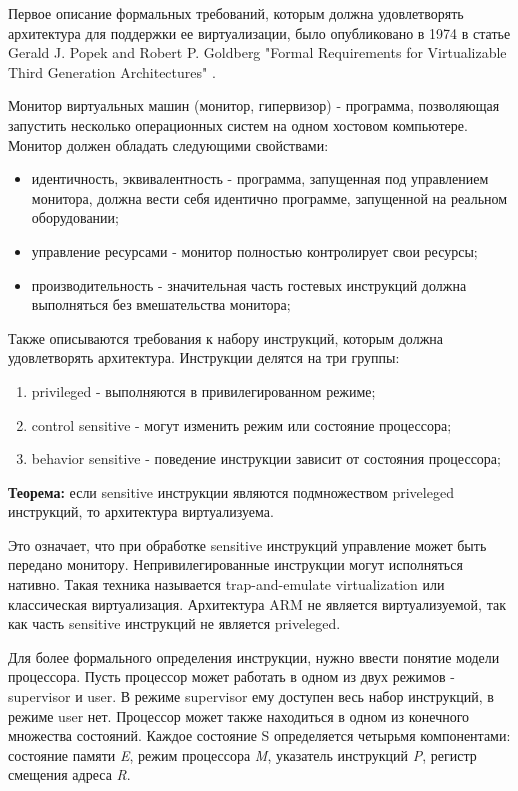 
Первое описание формальных требований, которым должна удовлетворять архитектура для поддержки ее виртуализации, было опубликовано в 1974 в статье Gerald J. Popek and Robert P. Goldberg "Formal Requirements for Virtualizable Third Generation Architectures" \cite{bib:popek_goldberg}.

Монитор виртуальных машин (монитор, гипервизор) - программа, позволяющая запустить несколько операционных систем на одном хостовом компьютере. Монитор должен обладать следующими свойствами:

\begin{itemize}
    \item идентичность, эквивалентность - программа, запущенная под управлением монитора, должна вести себя идентично программе, запущенной на реальном оборудовании;
    \item управление ресурсами - монитор полностью контролирует свои ресурсы;
    \item производительность - значительная часть гостевых инструкций должна выполняться без вмешательства монитора;
\end{itemize}

Также описываются требования к набору инструкций, которым должна удовлетворять архитектура. Инструкции делятся на три группы:

\begin{enumerate}
    \item privileged - выполняются в привилегированном режиме;
    \item control sensitive - могут изменить режим или состояние процессора;
    \item behavior sensitive - поведение инструкции зависит от состояния процессора;
\end{enumerate}

\textbf{Теорема: } если sensitive инструкции являются подмножеством priveleged инструкций, то архитектура виртуализуема.

Это означает, что при обработке sensitive инструкций управление может быть передано монитору. Непривилегированные инструкции могут исполняться нативно. Такая техника называется trap-and-emulate virtualization или классическая виртуализация. Архитектура ARM не является виртуализуемой, так как часть sensitive инструкций не является priveleged.

Для более формального определения инструкции, нужно ввести понятие модели процессора. Пусть процессор может работать в одном из двух режимов - supervisor и user. В режиме supervisor ему доступен весь набор инструкций, в режиме user нет. Процессор может также находиться в одном из конечного множества состояний. Каждое состояние S определяется четырьмя компонентами\cite{bib:popek_goldberg}: состояние памяти \textit{E}, режим процессора \textit{M}, указатель инструкций \textit{P}, регистр смещения адреса \textit{R}.

